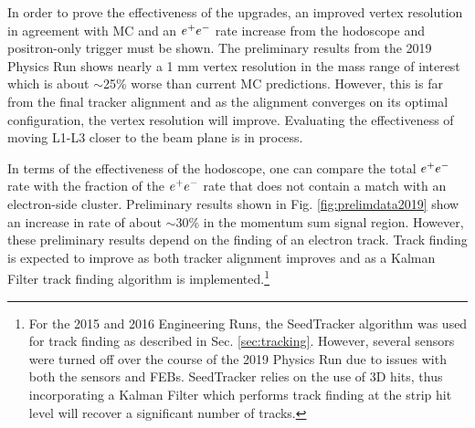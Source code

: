 In order to prove the effectiveness of the upgrades, an improved vertex resolution in agreement with MC and an $e^{+}e^{-}$ rate increase from the hodoscope and positron-only trigger must be shown. The preliminary results from the 2019 Physics Run shows nearly a 1 mm vertex resolution in the mass range of interest which is about $\sim$25\% worse than current MC predictions. However, this is far from the final tracker alignment and as the alignment converges on its optimal configuration, the vertex resolution will improve. Evaluating the effectiveness of moving L1-L3 closer to the beam plane is in process.

In terms of the effectiveness of the hodoscope, one can compare the total $e^{+}e^{-}$ rate with the fraction of the $e^{+}e^{-}$ rate that does not contain a match with an electron-side cluster. Preliminary results shown in Fig. \ref{fig:prelimdata2019} show an increase in rate of about $\sim 30$\% in the momentum sum signal region. However, these preliminary results depend on the finding of an electron track. Track finding is expected to improve as both tracker alignment improves and as a Kalman Filter track finding algorithm is implemented.\footnote{For the 2015 and 2016 Engineering Runs, the SeedTracker algorithm was used for track finding as described in Sec. \ref{sec:tracking}. However, several sensors were turned off over the course of the 2019 Physics Run due to issues with both the sensors and FEBs. SeedTracker relies on the use of 3D hits, thus incorporating a Kalman Filter which performs track finding at the strip hit level will recover a significant number of tracks.}

